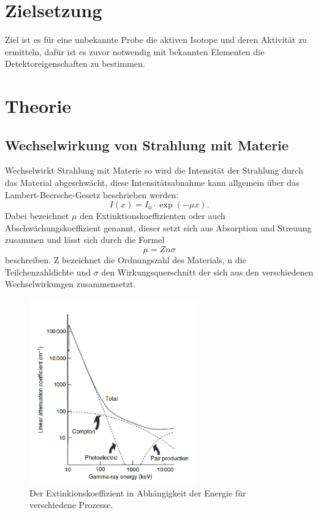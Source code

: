 \section{Zielsetzung}
Ziel ist es für eine unbekannte Probe die aktiven Isotope und deren Aktivität zu ermitteln,
dafür ist es zuvor notwendig mit bekannten Elementen die Detektoreigenschaften
zu bestimmen.

\section{Theorie}
\subsection{Wechselwirkung von Strahlung mit Materie}
Wechselwirkt Strahlung mit Materie so wird die Intensität der Strahlung durch das Material
abgeschwächt, diese Intensitätsabnahme kann allgemein über das Lambert-Beersche-Gesetz beschrieben werden:
\begin{equation}
  I(x)=I_0\cdot\exp(-\mu x).
  \label{eqn:lambert}
\end{equation}
Dabei bezeichnet $\mu$ den Extinktionskoeffizienten oder auch Abschwächungskoeffizient genannt, dieser
setzt sich aus Absorption und Streuung zusammen und lässt sich durch die Formel
\begin{equation}
  \mu=Zn\sigma
\end{equation}
beschreiben. Z bezeichnet die Ordnungszahl des Materials, n die Teilchenzahldichte und $\sigma$ den
Wirkungsquerschnitt der sich aus den verschiedenen Wechselwirkungen zusammensetzt.
\begin{figure}[H]
  \centering
  \includegraphics[height=8cm]{Extin.png}
  \caption{Der Extinkionskoeffizient in Abhängigkeit der Energie für verschiedene Prozesse. \cite{Gilmore2}}
  \label{fig:Extin}
\end{figure}
